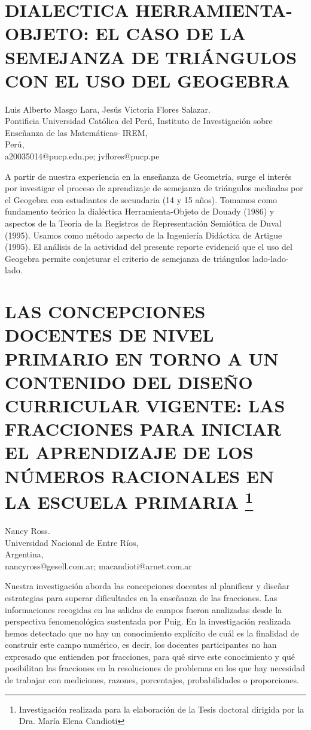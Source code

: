 \section{DIALECTICA HERRAMIENTA-OBJETO: EL CASO DE LA SEMEJANZA DE TRIÁNGULOS
CON EL USO DEL GEOGEBRA}

\begin{datos}
Luis Alberto Masgo Lara, Jesús Victoria Flores Salazar. \\
Pontificia Universidad Católica del Perú, Instituto de Investigación sobre Enseñanza de las Matemáticas- IREM,\\
\hfill Perú, \\
\hfill a20035014@pucp.edu.pe; jvflores@pucp.pe
\end{datos}

A partir de nuestra experiencia en la enseñanza de Geometría, surge
el interés por investigar el proceso de aprendizaje de semejanza de
triángulos mediadas por el Geogebra con estudiantes de secundaria
(14 y 15 años). Tomamos como fundamento teórico la dialéctica Herramienta-Objeto
de Douady (1986) y aspectos de la Teoría de la Registros de Representación
Semiótica de Duval (1995). Usamos como método aspecto de la Ingeniería
Didáctica de Artigue (1995). El análisis de la actividad del presente
reporte evidenció que el uso del Geogebra permite conjeturar el criterio
de semejanza de triángulos lado-lado-lado.


\section{LAS CONCEPCIONES DOCENTES DE NIVEL PRIMARIO EN TORNO A UN CONTENIDO
DEL DISEÑO CURRICULAR VIGENTE: LAS FRACCIONES PARA INICIAR EL APRENDIZAJE
DE LOS NÚMEROS RACIONALES EN LA ESCUELA PRIMARIA%
\footnote{Investigación realizada para la elaboración de la Tesis doctoral dirigida
por la Dra. María Elena Candioti%
}}

\begin{datos}
Nancy Ross. \\
Universidad Nacional de Entre Ríos,\\
\hfill Argentina, \\
\hfill nancyross@gesell.com.ar; macandioti@arnet.com.ar
\end{datos}

Nuestra investigación aborda las concepciones docentes al planificar
y diseñar estrategias para superar dificultades en la enseñanza de
las fracciones. Las informaciones recogidas en las salidas de campos
fueron analizadas desde la perspectiva fenomenológica sustentada por
Puig. En la investigación realizada hemos detectado que no hay un
conocimiento explícito de cuál es la finalidad de construir este campo
numérico, es decir, los docentes participantes no han expresado que
entienden por fracciones, para qué sirve este conocimiento y qué posibilitan
las fracciones en la resoluciones de problemas en los que hay necesidad
de trabajar con mediciones, razones, porcentajes, probabilidades o
proporciones.


